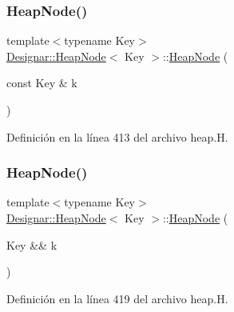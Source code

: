 \subsubsection{\texorpdfstring{Heap\+Node()}{HeapNode()}\hspace{0.1cm}{\footnotesize\ttfamily [2/4]}}
{\footnotesize\ttfamily template$<$typename Key$>$ \\
\hyperlink{class_designar_1_1_heap_node}{Designar\+::\+Heap\+Node}$<$ Key $>$\+::\hyperlink{class_designar_1_1_heap_node}{Heap\+Node} (\begin{DoxyParamCaption}\item[{const Key \&}]{k }\end{DoxyParamCaption})\hspace{0.3cm}{\ttfamily [inline]}}



Definición en la línea 413 del archivo heap.\+H.

\mbox{\label{class_designar_1_1_heap_node_a29189c1b5cd10290c2332e40cadbb899}} 
\subsubsection{\texorpdfstring{Heap\+Node()}{HeapNode()}\hspace{0.1cm}{\footnotesize\ttfamily [3/4]}}
{\footnotesize\ttfamily template$<$typename Key$>$ \\
\hyperlink{class_designar_1_1_heap_node}{Designar\+::\+Heap\+Node}$<$ Key $>$\+::\hyperlink{class_designar_1_1_heap_node}{Heap\+Node} (\begin{DoxyParamCaption}\item[{Key \&\&}]{k }\end{DoxyParamCaption})\hspace{0.3cm}{\ttfamily [inline]}}



Definición en la línea 419 del archivo heap.\+H.

\mbox{\label{class_designar_1_1_heap_node_aa4287eba82bce2dae37c5e3f4012b1b4}} 

